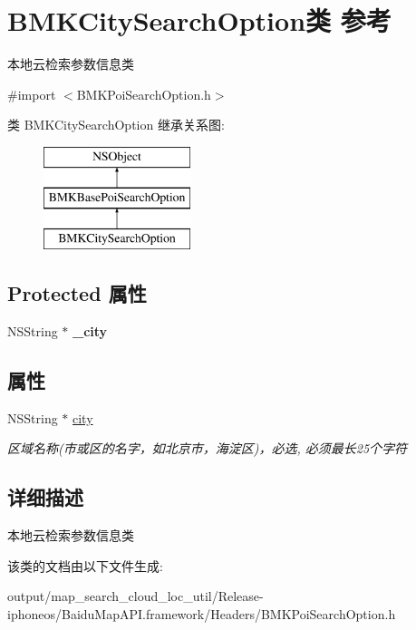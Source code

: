 \hypertarget{interface_b_m_k_city_search_option}{}\section{B\+M\+K\+City\+Search\+Option类 参考}
\label{interface_b_m_k_city_search_option}


本地云检索参数信息类  




{\ttfamily \#import $<$B\+M\+K\+Poi\+Search\+Option.\+h$>$}

类 B\+M\+K\+City\+Search\+Option 继承关系图\+:\begin{figure}[H]
\begin{center}
\leavevmode
\includegraphics[height=3.000000cm]{interface_b_m_k_city_search_option}
\end{center}
\end{figure}
\subsection*{Protected 属性}
\begin{DoxyCompactItemize}
\item 
\hypertarget{interface_b_m_k_city_search_option_a6d14cd2f7fcac7cd601ef9bfd0439720}{}N\+S\+String $\ast$ {\bfseries \+\_\+city}\label{interface_b_m_k_city_search_option_a6d14cd2f7fcac7cd601ef9bfd0439720}

\end{DoxyCompactItemize}
\subsection*{属性}
\begin{DoxyCompactItemize}
\item 
\hypertarget{interface_b_m_k_city_search_option_af9e2e37c3edcd43445f58660e770f8b1}{}N\+S\+String $\ast$ \hyperlink{interface_b_m_k_city_search_option_af9e2e37c3edcd43445f58660e770f8b1}{city}\label{interface_b_m_k_city_search_option_af9e2e37c3edcd43445f58660e770f8b1}

\begin{DoxyCompactList}\small\item\em 区域名称(市或区的名字，如北京市，海淀区)，必选, 必须最长25个字符 \end{DoxyCompactList}\end{DoxyCompactItemize}


\subsection{详细描述}
本地云检索参数信息类 

该类的文档由以下文件生成\+:\begin{DoxyCompactItemize}
\item 
output/map\+\_\+search\+\_\+cloud\+\_\+loc\+\_\+util/\+Release-\/iphoneos/\+Baidu\+Map\+A\+P\+I.\+framework/\+Headers/B\+M\+K\+Poi\+Search\+Option.\+h\end{DoxyCompactItemize}

